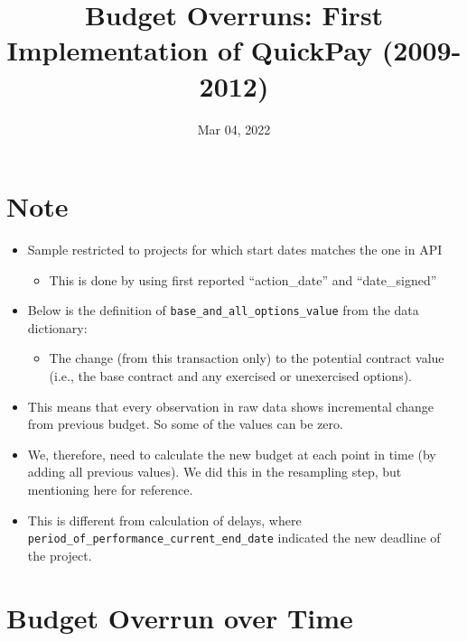 \documentclass[
]{article}
\title{Budget Overruns: First Implementation of QuickPay (2009-2012)}
\author{}
\date{\vspace{-2.5em}Mar 04, 2022}
\providecommand{\tightlist}{%
  \setlength{\itemsep}{0pt}\setlength{\parskip}{0pt}}
\begin{document}
\maketitle

\hypertarget{note}{%
\section{Note}\label{note}}

\begin{itemize}
\tightlist
\item
  Sample restricted to projects for which start dates matches the one in
  API

  \begin{itemize}
  \tightlist
  \item
    This is done by using first reported ``action\_date'' and
    ``date\_signed''
  \end{itemize}
\item
  Below is the definition of \texttt{base\_and\_all\_options\_value}
  from the data dictionary:

  \begin{itemize}
  \tightlist
  \item
    The change (from this transaction only) to the potential contract
    value (i.e., the base contract and any exercised or unexercised
    options).
  \end{itemize}
\item
  This means that every observation in raw data shows incremental change
  from previous budget. So some of the values can be zero.
\item
  We, therefore, need to calculate the new budget at each point in time
  (by adding all previous values). We did this in the resampling step,
  but mentioning here for reference.
\item
  This is different from calculation of delays, where
  \texttt{period\_of\_performance\_current\_end\_date} indicated the new
  deadline of the project.
\end{itemize}

\hypertarget{budget-overrun-over-time}{%
\section{Budget Overrun over Time}\label{budget-overrun-over-time}}
\end{document}
